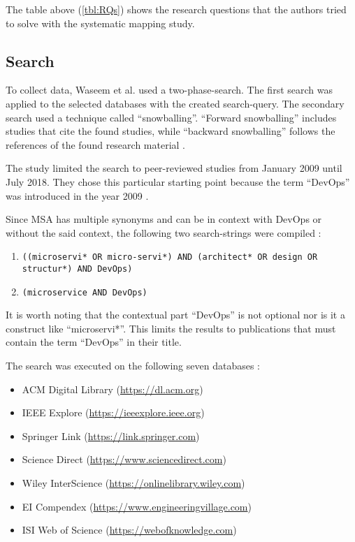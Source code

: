 The table above (\autoref{tbl:RQs}) shows the research questions that the authors
tried to solve with the systematic mapping study.

\subsection{Search}

To collect data, Waseem et al. used a two-phase-search. The first search was applied
to the selected databases with the created search-query. The secondary
search used a technique called ``snowballing''. ``Forward snowballing''
includes studies that cite the found studies, while ``backward snowballing''
follows the references of the found research material \cite{wohlin:Snowballing}.

The study limited the search to peer-reviewed studies from January 2009 until
July 2018. They chose this particular starting point because the term ``DevOps''
was introduced in the year 2009 \cite{waseem:SMSMSADevOps}.

Since MSA has multiple synonyms and can be in context with DevOps or without
the said context, the following two search-strings were compiled \cite{waseem:SMSMSADevOps}:

\begin{enumerate}
    \item \texttt{((microservi* OR micro-servi*)
    AND (architect* OR design OR structur*) AND DevOps)}
    \item \texttt{(microservice AND DevOps)}
\end{enumerate}

It is worth noting that the contextual part ``DevOps'' is not optional nor is
it a construct like ``microservi*''. This limits the results to publications 
that must contain the term ``DevOps'' in their title.

The search was executed on the following seven databases \cite{waseem:SMSMSADevOps}:

\begin{itemize}
    \item ACM Digital Library (\url{https://dl.acm.org})
    \item IEEE Explore (\url{https://ieeexplore.ieee.org})
    \item Springer Link (\url{https://link.springer.com})
    \item Science Direct (\url{https://www.sciencedirect.com})
    \item Wiley InterScience (\url{https://onlinelibrary.wiley.com})
    \item EI Compendex (\url{https://www.engineeringvillage.com})
    \item ISI Web of Science (\url{https://webofknowledge.com})
\end{itemize}

